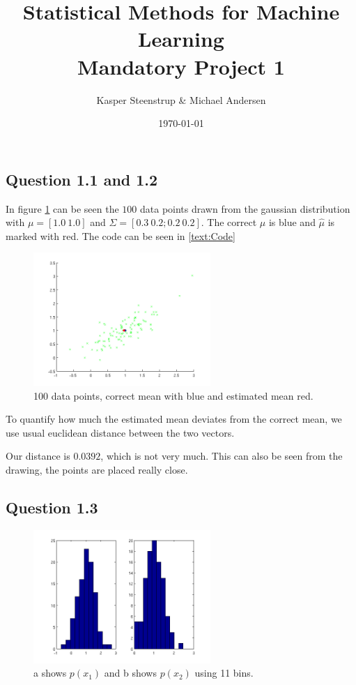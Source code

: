 \documentclass[a4paper, 10pt, final]{article}
\title{Statistical Methods for Machine Learning \\ Mandatory Project 1}
\author{Kasper Steenstrup \& Michael Andersen}
\date{\today}
\begin{document}
\maketitle

\subsection*{Question 1.1 and 1.2}

In figure \ref{fig:q1_1} can be seen the $100$ data points drawn from
the gaussian distribution with $\mu = [1.0~ 1.0]$ and $\Sigma = [0.3~
  0.2; 0.2~ 0.2]$. The correct $\mu$ is blue and $\widehat{\mu}$ is
marked with red. The code can be seen in \ref{text:Code}

\begin{figure}[!ht]
  \centering
  \includegraphics[width=0.6\textwidth]{images/q1_1}
  \caption{100 data points, correct mean with blue and estimated mean red.}
  \label{fig:q1_1}
\end{figure}

To quantify how much the estimated mean deviates from the correct
mean, we use usual euclidean distance between the two vectors.

Our distance is $0.0392$, which is not very much. This can also be
seen from the drawing, the points are placed really close.

\subsection*{Question 1.3}

\begin{figure}[!ht]
  \centering
  \includegraphics[width=0.6\textwidth]{images/q1_3a}
  \caption{a shows $p(x_1)$ and b shows $p(x_2)$ using 11 bins.}
  \label{fig:q1_3a}
\end{figure}
\end{document}
